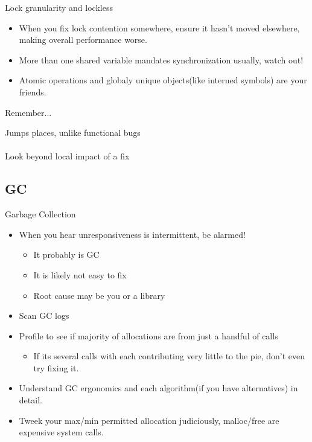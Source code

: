 \documentclass{beamer}
\begin{document}
\begin{frame}{Lock granularity and lockless}
  \begin{itemize}
  \item When you fix lock contention somewhere, ensure it hasn't moved elsewhere, making overall performance worse.
    \pause
  \item More than one shared variable mandates synchronization usually, watch out!
    \pause
  \item Atomic operations and globaly unique objects(like interned symbols) are your friends.
  \end{itemize}
\end{frame}

\begin{frame}{Remember...}
  \begin{center}
    \large{Jumps places, unlike functional bugs}\quad\\
    \quad\\
    \small{Look beyond local impact of a fix}
  \end{center}
\end{frame}

\subsection{GC}

\begin{frame}{Garbage Collection}
  \begin{itemize}
  \item When you hear unresponsiveness is intermittent, be alarmed!
    \begin{itemize}
    \item It probably is GC
    \item It is likely not easy to fix
    \item Root cause may be you or a library
    \end{itemize}
    \pause
  \item Scan GC logs
    \pause
  \item Profile to see if majority of allocations are from just a handful of calls
    \begin{itemize}
      \item If its several calls with each contributing very little to the pie, don't even try fixing it.
    \end{itemize}
    \pause
  \item Understand GC ergonomics and each algorithm(if you have alternatives) in detail.
  \item Tweek your max/min permitted allocation judiciously, malloc/free are expensive system calls.
  \end{itemize}
\end{frame}
\end{document}

